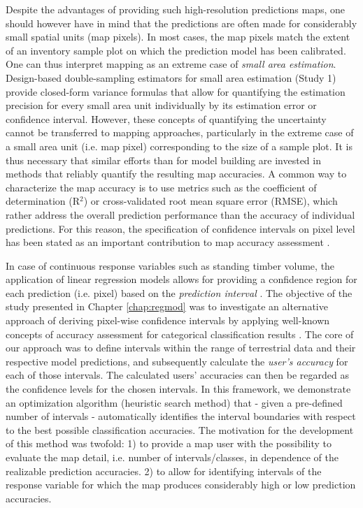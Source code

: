 Despite the advantages of providing such high-resolution predictions maps, one should however have in mind that the predictions are often made for considerably small spatial units (map pixels). In most cases, the map pixels match the extent of an inventory sample plot on which the prediction model has been calibrated. One can thus interpret mapping as an extreme case of \textit{small area estimation}. Design-based double-sampling estimators for small area estimation (Study 1) provide closed-form variance formulas that allow for quantifying the estimation precision for every small area unit individually by its estimation error or confidence interval. However, these concepts of quantifying the uncertainty cannot be transferred to mapping approaches, particularly in the extreme case of a small area unit (i.e. map pixel) corresponding to the size of a sample plot. It is thus necessary that similar efforts than for model building are invested in methods that reliably quantify the resulting map accuracies. A common way to characterize the map accuracy is to use metrics such as the coefficient of determination (R$^2$) or cross-validated root mean square error (RMSE), which rather address the overall prediction performance than the accuracy of individual predictions. For this reason, the specification of confidence intervals on pixel level has been stated as an important contribution to map accuracy assessment \citep{mcroberts2010a}.\par

In case of continuous response variables such as standing timber volume, the application of linear regression models allows for providing a confidence region for each prediction (i.e. pixel) based on the \textit{prediction interval} \citep[pp.136--139]{fahrmeir2013}. The objective of the study presented in Chapter \ref{chap:regmod} was to investigate an alternative approach of deriving pixel-wise confidence intervals by applying well-known concepts of accuracy assessment for categorical classification results \citep{congalton2008}. The core of our approach was to define intervals within the range of terrestrial data and their respective model predictions, and subsequently calculate the \textit{user's accuracy} for each of those intervals. The calculated users' accuracies can then be regarded as the confidence levels for the chosen intervals. In this framework, we demonstrate an optimization algorithm (heuristic search method) that - given a pre-defined number of intervals - automatically identifies the interval boundaries with respect to the best possible classification accuracies. The motivation for the development of this method was twofold: 1) to provide a map user with the possibility to evaluate the map detail, i.e. number of intervals/classes, in dependence of the realizable prediction accuracies. 2) to allow for identifying intervals of the response variable for which the map produces considerably high or low prediction accuracies.\par 

